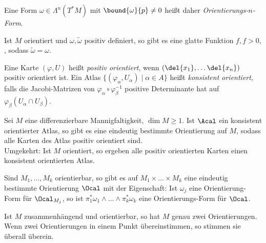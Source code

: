 \begin{rem*}
	Eine Form \( \omega \in \Lambda^n(T^*M)\) mit \( \bound{\omega}{p} \neq 0 \) heißt daher \emph{Orientierungs-$n$-Form}.
\end{rem*}

Ist $M$ orientiert und $\omega, \tilde{\omega}$ positiv definiert, so gibt es eine glatte Funktion \( f, f > 0, \), sodass \( \tilde{\omega} = \omega \).

\begin{defn*}
	Eine Karte \( (\varphi,U) \) heißt \emph{positiv orientiert}, wenn \( (\del{x_1}, \dotsc \del{x_n}) \) positiv orientiert ist. Ein Atlas \( \{(\varphi_\alpha, U_\alpha) \mid \alpha \in A\} \) heißt \emph{konsistent orientiert}, falls die Jacobi-Matrizen von \( \varphi_\alpha \circ \varphi_\beta^{-1} \) positive Determinante hat auf \( \varphi_\beta(U_\alpha \cap U_\beta) \).
\end{defn*}

\begin{lem}
	Sei $M$ eine differenzierbare Mannigfaltigkeit, $\dim M \geq 1$. Ist $\Acal$ ein konsistent orientierter Atlas, so gibt es eine eindeutig bestimmte Orientierung auf $M$, sodass alle Karten des Atlas positiv orientiert sind.\\
	Umgekehrt: Ist $M$ orientiert, so ergeben alle positiv orientierten Karten einen konsistent orientierten Atlas.
\end{lem}

\begin{lem}
	Sind \( M_1, \dotsc, M_k \) orientierbar, so gibt es auf \( M_1 \times \dots \times M_k \) eine eindeutig bestimmte Orientierung $\Ocal$ mit der Eigenschaft: Ist $\omega_j$ eine Orientierung-Form für $\Ocal_{M_j}$, so ist \( \pi_1^*\omega_1 \wedge \dots \wedge \pi_k^*\omega_k \) eine Orientierungs-Form für $\Ocal$.
\end{lem}

\begin{lem}
	Ist $M$ zusammenhängend und orientierbar, so hat $M$ genau zwei Orientierungen. Wenn zwei Orientierungen in einem Punkt übereinstimmen, so stimmen sie überall überein.
\end{lem}